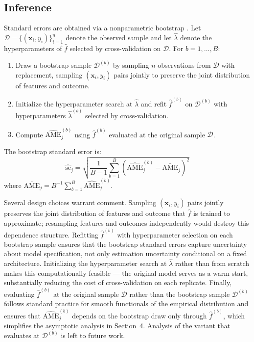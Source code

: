 \documentclass[12pt]{article}
\begin{document}
	\subsection{Inference}
	
	Standard errors are obtained via a nonparametric bootstrap \citep{efron1979, efrontibshirani1993}. Let $\mathcal{D} = \{(\mathbf{x}_i, y_i)\}_{i=1}^n$ denote the observed sample and let $\hat{\lambda}$ denote the hyperparameters of $\hat{f}$ selected by cross-validation on $\mathcal{D}$. For $b = 1, \dots, B$:
	\begin{enumerate}[(1)]
		\item Draw a bootstrap sample $\mathcal{D}^{(b)}$ by sampling $n$ observations from $\mathcal{D}$ with replacement, sampling $(\mathbf{x}_i, y_i)$ pairs jointly to preserve the joint distribution of features and outcome.
		\item Initialize the hyperparameter search at $\hat{\lambda}$ and refit $\hat{f}^{(b)}$ on $\mathcal{D}^{(b)}$ with hyperparameters $\hat{\lambda}^{(b)}$ selected by cross-validation.
		\item Compute $\widehat{\mathrm{AME}}_j^{(b)}$ using $\hat{f}^{(b)}$ evaluated at the original sample $\mathcal{D}$.
	\end{enumerate}
	The bootstrap standard error is:
	\begin{equation}
		\widehat{\mathrm{se}}_j = \sqrt{\frac{1}{B-1}\sum_{b=1}^B \left(\widehat{\mathrm{AME}}_j^{(b)} - \bar{\mathrm{AME}}_j\right)^2}
	\end{equation}
	where $\bar{\mathrm{AME}}_j = B^{-1}\sum_{b=1}^B \widehat{\mathrm{AME}}_j^{(b)}$.
	
	Several design choices warrant comment. Sampling $(\mathbf{x}_i, y_i)$ pairs jointly preserves the joint distribution of features and outcome that $\hat{f}$ is trained to approximate; resampling features and outcomes independently would destroy this dependence structure. Refitting $\hat{f}^{(b)}$ with hyperparameter selection on each bootstrap sample ensures that the bootstrap standard errors capture uncertainty about model specification, not only estimation uncertainty conditional on a fixed architecture. Initializing the hyperparameter search at $\hat{\lambda}$ rather than from scratch makes this computationally feasible --- the original model serves as a warm start, substantially reducing the cost of cross-validation on each replicate. Finally, evaluating $\hat{f}^{(b)}$ at the original sample $\mathcal{D}$ rather than the bootstrap sample $\mathcal{D}^{(b)}$ follows standard practice for smooth functionals of the empirical distribution \citep{efrontibshirani1993} and ensures that $\widehat{\mathrm{AME}}_j^{(b)}$ depends on the bootstrap draw only through $\hat{f}^{(b)}$, which simplifies the asymptotic analysis in Section~4. Analysis of the variant that evaluates at $\mathcal{D}^{(b)}$ is left to future work.
	
\end{document}
